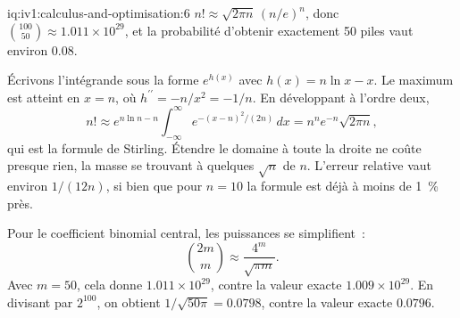 \begin{solution}{iq:iv1:calculus-and-optimisation:6}
$n! \approx \sqrt{2\pi n}\,(n/e)^n$, donc $\binom{100}{50} \approx 1.011 \times 10^{29}$, et la probabilité d'obtenir exactement 50 piles vaut environ $0.08$.

Écrivons l'intégrande sous la forme $e^{h(x)}$ avec $h(x) = n\ln x - x$. Le maximum est atteint en $x = n$, où $h^{\prime\prime} = -n/x^2 = -1/n$. En développant à l'ordre deux,
\[
n! \approx e^{n\ln n - n}\int_{-\infty}^{\infty} e^{-(x - n)^2/(2n)}\,dx = n^n e^{-n}\sqrt{2\pi n},
\]
qui est la formule de Stirling. Étendre le domaine à toute la droite ne coûte presque rien, la masse se trouvant à quelques $\sqrt{n}$ de $n$. L'erreur relative vaut environ $1/(12n)$, si bien que pour $n = 10$ la formule est déjà à moins de 1~\% près.

Pour le coefficient binomial central, les puissances se simplifient~:
\[
\binom{2m}{m} \approx \frac{4^m}{\sqrt{\pi m}}.
\]
Avec $m = 50$, cela donne $1.011 \times 10^{29}$, contre la valeur exacte $1.009 \times 10^{29}$. En divisant par $2^{100}$, on obtient $1/\sqrt{50\pi} = 0.0798$, contre la valeur exacte $0.0796$.



\end{solution}

